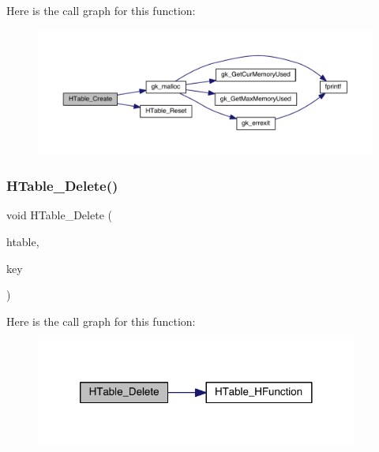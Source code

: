 Here is the call graph for this function\+:\nopagebreak
\begin{figure}[H]
\begin{center}
\leavevmode
\includegraphics[width=350pt]{a00077_a8dc2b324b10c45883dacbf58ac0b7efd_cgraph}
\end{center}
\end{figure}
\mbox{\label{a00077_a19564e2cf9bc13d7ba8b8d4ed2e9b1d1}} 
\subsubsection{\texorpdfstring{H\+Table\+\_\+\+Delete()}{HTable\_Delete()}}
{\footnotesize\ttfamily void H\+Table\+\_\+\+Delete (\begin{DoxyParamCaption}\item[{\hyperlink{a00650}{gk\+\_\+\+H\+Table\+\_\+t} $\ast$}]{htable,  }\item[{int}]{key }\end{DoxyParamCaption})}

Here is the call graph for this function\+:\nopagebreak
\begin{figure}[H]
\begin{center}
\leavevmode
\includegraphics[width=300pt]{a00077_a19564e2cf9bc13d7ba8b8d4ed2e9b1d1_cgraph}
\end{center}
\end{figure}
\mbox{\label{a00077_a4552b6bc8e0b509913638222daecf3aa}} 
